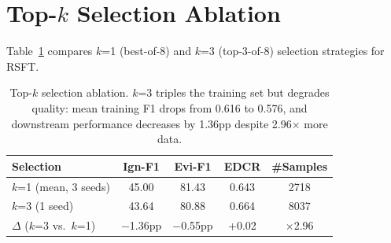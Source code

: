 \documentclass[11pt,a4paper]{article}
\begin{document}
\section{Top-$k$ Selection Ablation}
\label{app:topk}

Table~\ref{tab:topk} compares $k$=1 (best-of-8) and $k$=3 (top-3-of-8) selection strategies for RSFT.

\begin{table}[t]
\centering
\small
\begin{tabular}{lcccc}
\toprule
\textbf{Selection} & \textbf{Ign-F1} & \textbf{Evi-F1} & \textbf{EDCR} & \textbf{\#Samples} \\
\midrule
$k$=1 (mean, 3 seeds) & 45.00 & 81.43 & 0.643 & 2718 \\
$k$=3 (1 seed) & 43.64 & 80.88 & 0.664 & 8037 \\
\midrule
$\Delta$ ($k$=3 vs.\ $k$=1) & $-$1.36pp & $-$0.55pp & +0.02 & $\times$2.96 \\
\bottomrule
\end{tabular}
\caption{Top-$k$ selection ablation. $k$=3 triples the training set but degrades quality: mean training F1 drops from 0.616 to 0.576, and downstream performance decreases by 1.36pp despite 2.96$\times$ more data.}
\label{tab:topk}
\end{table}
\end{document}
